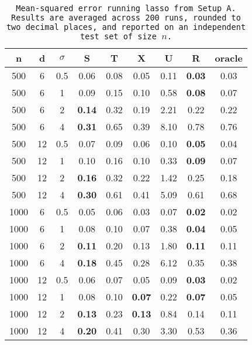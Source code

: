 \begin{table}[ht]
\centering
\begin{tabular}{ccccccccc}
  \hline
n & d & $\sigma$ & S & T & X & U & R & oracle \\ 
  \hline
500 & 6 & 0.5 & 0.06 & 0.08 & 0.05 &  0.11 & \bf 0.03 & 0.03 \\ 
  500 & 6 & 1 & 0.09 & 0.15 & 0.10 &  0.58 & \bf 0.08 & 0.07 \\ 
  500 & 6 & 2 & \bf 0.14 & 0.32 & 0.19 &  2.21 & 0.22 & 0.22 \\ 
  500 & 6 & 4 & \bf 0.31 & 0.65 & 0.39 &  8.10 & 0.78 & 0.76 \\ 
  500 & 12 & 0.5 & 0.07 & 0.09 & 0.06 &  0.10 & \bf 0.05 & 0.04 \\ 
  500 & 12 & 1 & 0.10 & 0.16 & 0.10 &  0.33 & \bf 0.09 & 0.07 \\ 
  500 & 12 & 2 & \bf 0.16 & 0.32 & 0.22 &  1.42 & 0.25 & 0.18 \\ 
  500 & 12 & 4 & \bf 0.30 & 0.61 & 0.41 &  5.09 & 0.61 & 0.68 \\ 
  1000 & 6 & 0.5 & 0.05 & 0.06 & 0.03 &  0.07 & \bf 0.02 & 0.02 \\ 
  1000 & 6 & 1 & 0.08 & 0.10 & 0.07 &  0.38 & \bf 0.04 & 0.05 \\ 
  1000 & 6 & 2 & \bf 0.11 & 0.20 & 0.13 &  1.80 & \bf 0.11 & 0.11 \\ 
  1000 & 6 & 4 & \bf 0.18 & 0.45 & 0.28 &  6.12 & 0.35 & 0.38 \\ 
  1000 & 12 & 0.5 & 0.06 & 0.07 & 0.05 &  0.09 & \bf 0.03 & 0.02 \\ 
  1000 & 12 & 1 & 0.08 & 0.10 & \bf 0.07 &  0.22 & \bf 0.07 & 0.05 \\ 
  1000 & 12 & 2 & \bf 0.13 & 0.23 & \bf 0.13 &  0.84 & 0.14 & 0.11 \\ 
  1000 & 12 & 4 & \bf 0.20 & 0.41 & 0.30 &  3.30 & 0.53 & 0.36 \\ 
   \hline
\end{tabular}
\caption{\tt Mean-squared error running \texttt{lasso} from Setup A. Results are averaged across 200 runs, rounded to two decimal places, and reported on an independent test set of size $n$.} 
\label{table:setup1}
\end{table}
